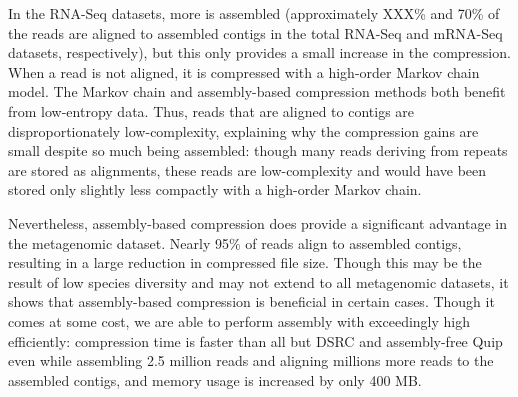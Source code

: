 \documentclass[twocolumn]{article}
\begin{document}
In the RNA-Seq datasets, more is assembled (approximately XXX\% and 70\% of
the reads are aligned to assembled contigs in the total RNA-Seq and mRNA-Seq
datasets, respectively), but this only provides a small increase in the
compression. When a read is not aligned, it is compressed with a high-order
Markov chain model. The Markov chain and assembly-based compression methods
both benefit from low-entropy data. Thus, reads that are aligned to contigs
are disproportionately low-complexity, explaining why the compression gains
are small despite so much being assembled: though many reads deriving from
repeats are stored as alignments, these reads are low-complexity and would
have been stored only slightly less compactly with a high-order Markov chain.

Nevertheless, assembly-based compression does provide a significant advantage
in the metagenomic dataset. Nearly 95\% of reads align to assembled contigs,
resulting in a large reduction in compressed file size. Though this may be the
result of low species diversity and may not extend to all metagenomic
datasets, it shows that assembly-based compression is beneficial in certain
cases. Though it comes at some cost, we are able to perform assembly with
exceedingly  high efficiently: compression time is faster than all but DSRC
and assembly-free Quip even while assembling 2.5 million reads and aligning
millions more reads to the assembled contigs, and memory usage is increased by
only 400 MB.
\end{document}
